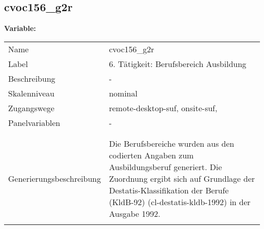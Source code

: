 	
	
	\subsection{cvoc156\_g2r}
	\label{subSection:cvoc156_g2r}

	\noindent\textbf{Variable:}\\
		\begin{tabular}{lL{11.3cm}}
			\label{tableVariable:cvoc156_g2r}
			Name & cvoc156\_g2r \\
			Label & 6. Tätigkeit: Berufsbereich Ausbildung \\
			Beschreibung & - \\
			Skalenniveau & nominal \\
			Zugangswege &
				remote-desktop-suf,
				onsite-suf,
 \\
			Panelvariablen & -
			 \\
			 \\
 \\
					Generierungsbeschreibung & Die Berufsbereiche wurden aus den codierten Angaben zum Ausbildungsberuf generiert. Die Zuordnung ergibt sich auf Grundlage der Destatis-Klassifikation der Berufe (KldB-92) (cl-destatis-kldb-1992) in der Ausgabe 1992. 
				 \\	
			 \\
		\end{tabular}






